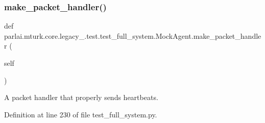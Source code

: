 \subsubsection{\texorpdfstring{make\+\_\+packet\+\_\+handler()}{make\_packet\_handler()}}
{\footnotesize\ttfamily def parlai.\+mturk.\+core.\+legacy\+\_.\+test.\+test\+\_\+full\+\_\+system.\+Mock\+Agent.\+make\+\_\+packet\+\_\+handler (\begin{DoxyParamCaption}\item[{}]{self }\end{DoxyParamCaption})}

\begin{DoxyVerb}A packet handler that properly sends heartbeats.
\end{DoxyVerb}
 

Definition at line 230 of file test\+\_\+full\+\_\+system.\+py.


